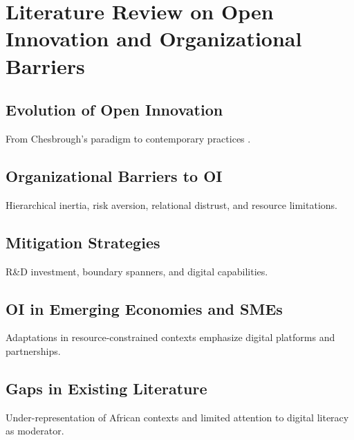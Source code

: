 \chapter{Literature Review on Open Innovation and Organizational Barriers}
\section{Evolution of Open Innovation}
From Chesbrough's paradigm to contemporary practices \parencite{chesbrough2003,bogers2018,huizingh2011}.
\section{Organizational Barriers to OI}
Hierarchical inertia, risk aversion, relational distrust, and resource limitations.
\section{Mitigation Strategies}
R\&D investment, boundary spanners, and digital capabilities.
\section{OI in Emerging Economies and SMEs}
Adaptations in resource-constrained contexts emphasize digital platforms and partnerships.
\section{Gaps in Existing Literature}
Under-representation of African contexts and limited attention to digital literacy as moderator.
